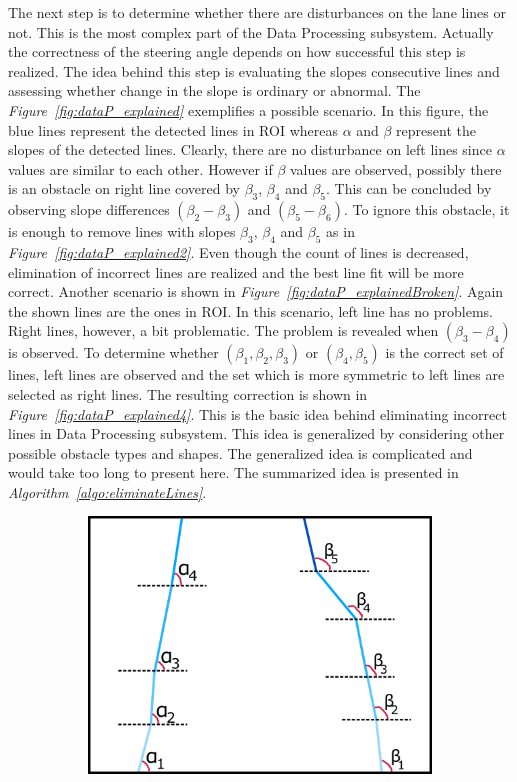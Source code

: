 \documentclass[a4paper,12pt]{article}
\begin{document}
\begin{enumerate}
	
	The next step is to determine whether there are disturbances on the lane lines or not. This is the most complex part of the Data Processing subsystem. Actually the correctness of the steering angle depends on how successful this step is realized. The idea behind this step is evaluating the slopes consecutive lines and assessing whether change in the slope is ordinary or abnormal. The \textit{Figure~\ref{fig:dataP_explained}} exemplifies a possible scenario. In this figure, the blue lines represent the detected lines in ROI whereas $\alpha$ and $\beta$ represent the slopes of the detected lines. Clearly, there are no disturbance on left lines since $\alpha$ values are similar to each other. However if $\beta$ values are observed, possibly there is an obstacle on right line covered by $\beta_3$, $\beta_4$ and $\beta_5$. This can be concluded by observing slope differences $(\beta_2 - \beta_3)$ and $(\beta_5 - \beta_6)$. To ignore this obstacle, it is enough to remove lines with slopes $\beta_3$, $\beta_4$ and $\beta_5$ as in \textit{Figure~\ref{fig:dataP_explained2}}. Even though the count of lines is decreased, elimination of incorrect lines are realized and the best line fit will be more correct. Another scenario is shown in \textit{Figure~\ref{fig:dataP_explainedBroken}}. Again the shown lines are the ones in ROI. In this scenario, left line has no problems. Right lines, however, a bit problematic. The problem is revealed when  $(\beta_3 - \beta_4)$ is observed. To determine whether  $(\beta_1, \beta_2, \beta_3)$ or $(\beta_4, \beta_5)$ is the correct set of lines, left lines are observed and the set which is more symmetric to left lines are selected as right lines. The resulting correction is shown in \textit{Figure~\ref{fig:dataP_explained4}}.	This is the basic idea behind eliminating incorrect lines in Data Processing subsystem. This idea is generalized by considering other possible obstacle types and shapes. The generalized idea is complicated and would take too long to present here. The summarized idea is presented in \textit{Algorithm~\ref{algo:eliminateLines}}.
	\begin{figure}[h!]
	\setlength{\unitlength}{\textwidth} 
	\centering
	\begin{subfigure}{.46\textwidth}
		\centering
		\includegraphics[width=0.44\unitlength]{images/dataP_explained3}

\end{subfigure}
\end{figure}
\end{enumerate}
\end{document}
